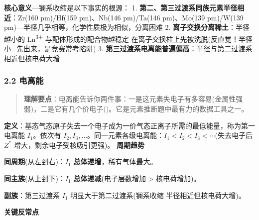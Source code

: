 \textbf{核心意义}---镧系收缩是以下事实的根源：
1. \textbf{第二、第三过渡系同族元素半径相近}：Zr(160 pm)/Hf(159 pm)、Nb(146 pm)/Ta(146 pm)、Mo(139 pm)/W(139 pm)---半径几乎相等，化学性质极为相似，分离困难
2. \textbf{离子交换分离稀土}：半径越小的 Ln\textsuperscript{3+} 与配体形成的配合物越稳定 \箭 在离子交换柱上先被洗脱(反直觉！半径小=先出来，是竞赛常考陷阱)
3. \textbf{第三过渡系电离能普遍偏高}：半径与第二过渡系相近但核电荷大增

\subsubsection{2.2 电离能}\label{ux7535ux79bbux80fd}

\begin{quote}
\textbf{理解要点}：电离能告诉你两件事：一是这元素失电子有多容易(金属性强弱)，二是它有几个价电子()。它是元素推断题中最有力的数据工具之一。
\end{quote}

\textbf{定义}：基态气态原子失去一个电子成为一价气态正离子所需的最低能量，称为第一电离能 \(I_1\)。依次有 \(I_2, I_3, \dots\)。同一元素各级电离能：\(I_1 < I_2 < I_3 < \cdots\)(失去电子后 \(Z^*\) 增大，剩余电子受核吸引更强)。
\textbf{周期趋势}

\textbf{同周期}(从左到右)：\(I_1\) \textbf{总体递增}，稀有气体最大。

\textbf{同主族}(从上到下)：\(I_1\) \textbf{总体递减}(电子层数增加 \textgreater{} 核电荷增加)。

\textbf{副族}：第三过渡系 \(I_1\) 明显大于第二过渡系(镧系收缩 \箭 半径相近但核电荷大增)。

\textbf{关键反常点}

